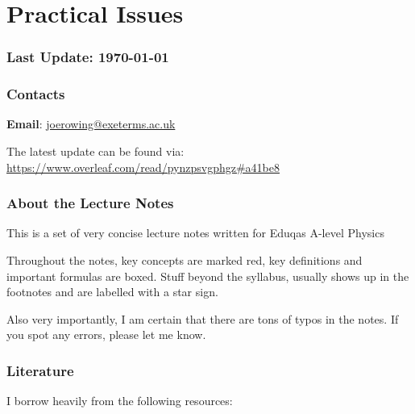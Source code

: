 \chapter*{Practical Issues}

\subsection*{Last Update: \today}

\subsection*{Contacts}
\textbf{Email}: \url{joerowing@exeterms.ac.uk}

The latest update can be found via: \url{https://www.overleaf.com/read/pynzpsvgphgz#a41be8}

%



\subsection*{About the Lecture Notes}

This is a set of very concise lecture notes written for Eduqas A-level Physics

Throughout the notes, key concepts are marked red, key definitions and important formulas are boxed. Stuff beyond the syllabus, usually shows up in the footnotes and are labelled with a star sign.

Also very importantly, I am certain that there are tons of typos in the notes. If you spot any errors, please let me know.


\subsection*{Literature}

I borrow heavily from the following resources:

